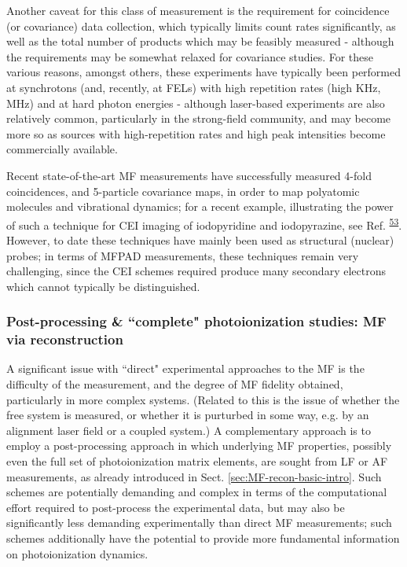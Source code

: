 \documentclass[10pt]{article}
\begin{document}
Another caveat for this class of measurement is the requirement for coincidence (or covariance) data collection, which typically limits count rates significantly, as well as the total number of products which may be feasibly measured - although the requirements may be somewhat relaxed for covariance studies. For these various reasons, amongst others, these experiments have typically been performed at synchrotons (and, recently, at FELs) with high repetition rates (high KHz, MHz) and at hard photon energies - although laser-based experiments are also relatively common, particularly in the strong-field community, and may become more so as sources with high-repetition rates and high peak intensities become commercially available. 

Recent state-of-the-art MF measurements have successfully measured 4-fold coincidences, and 5-particle covariance maps, in order to map polyatomic molecules and vibrational dynamics; %
for a recent example, illustrating the power of such a technique for CEI imaging of iodopyridine and iodopyrazine, see Ref.   \textsuperscript{\hyperref[csl:53]{53}}. However, to date these techniques have mainly been used as structural (nuclear) probes; in terms of MFPAD measurements, these techniques remain very challenging, since the CEI schemes required produce many secondary electrons which cannot typically be distinguished. 



\subsubsection{Post-processing \& ``complete" photoionization studies: MF via reconstruction\label{sec:MF-recon-expt}}


A significant issue with ``direct" experimental approaches to the MF is the difficulty of the measurement, and the degree of MF fidelity obtained, particularly in more complex systems. (Related to this is the issue of whether the free system is measured, or whether it is purturbed in some way, e.g. by an alignment laser field or a coupled system.) A complementary approach is to employ a post-processing approach in which underlying MF properties, possibly even the full set of photoionization matrix elements, are sought from LF or AF measurements, as already introduced in Sect. \ref{sec:MF-recon-basic-intro}. Such schemes are potentially demanding and complex in terms of the computational effort required to post-process the experimental data, but may also be significantly less demanding experimentally than direct MF measurements; such schemes additionally have the potential to provide more fundamental information on photoionization dynamics.
\end{document}
